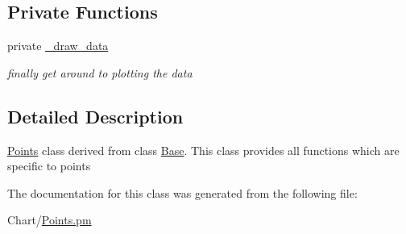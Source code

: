 \subsection*{Private Functions}
\label{_amgrp8d29cff216bafa3117e21883ea7c6b5f}
 \begin{DoxyCompactItemize}
\item 
\hypertarget{classChart_1_1Points_afabf6460cdf4056cdbef97146941f671}{
private \hyperlink{classChart_1_1Points_afabf6460cdf4056cdbef97146941f671}{\_\-draw\_\-data}}
\label{classChart_1_1Points_afabf6460cdf4056cdbef97146941f671}

\begin{DoxyCompactList}\small\item\em finally get around to plotting the data \item\end{DoxyCompactList}\end{DoxyCompactItemize}


\subsection{Detailed Description}
\hyperlink{classChart_1_1Points}{Points} class derived from class \hyperlink{classChart_1_1Base}{Base}. This class provides all functions which are specific to points 

The documentation for this class was generated from the following file:\begin{DoxyCompactItemize}
\item 
Chart/\hyperlink{Points_8pm}{Points.pm}\end{DoxyCompactItemize}
